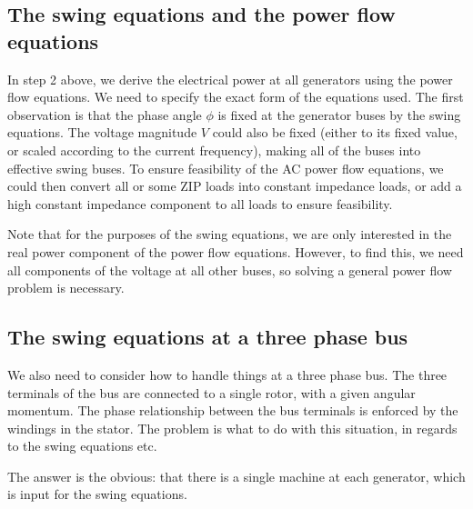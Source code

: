 \documentclass[11pt]{article}
\begin{document}
\subsection{The swing equations and the power flow equations}
In step 2 above, we derive the electrical power at all generators using the power flow equations. We need to specify the exact form of the equations used. The first observation is that the phase angle $\phi$ is fixed at the generator buses by the swing equations. The voltage magnitude $V$ could also be fixed (either to its fixed value, or scaled according to the current frequency), making all of the buses into effective swing buses. To ensure feasibility of the AC power flow equations, we could then convert all or some ZIP loads into constant impedance loads, or add a high constant impedance component to all loads to ensure feasibility.

Note that for the purposes of the swing equations, we are only interested in the real power component of the power flow equations. However, to find this, we need all components of the voltage at all other buses, so solving a general power flow problem is necessary.

\subsection{The swing equations at a three phase bus}
We also need to consider how to handle things at a three phase bus. The three terminals of the bus are connected to a single rotor, with a given angular momentum. The phase relationship between the bus terminals is enforced by the windings in the stator. The problem is what to do with this situation, in regards to the swing equations etc.

The answer is the obvious: that there is a single machine at each generator, which is input for the swing equations. 
\end{document}
